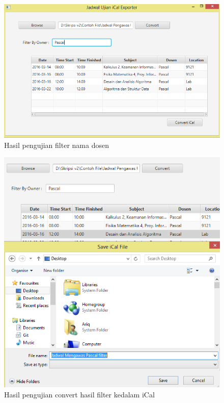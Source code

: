 		\begin{figure}[H]
		\centering
		\includegraphics[scale=0.7]{Gambar/filterDosen}
		\caption{Hasil pengujian filter nama dosen}
		\label{fig:filterDosen}
		\end{figure}

		\begin{figure}[H]
		\centering
		\includegraphics[scale=0.6]{Gambar/filterKonvertiCal}
		\caption{Hasil pengujian convert hasil filter kedalam iCal}
		\label{fig:filterKonvertiCal}
		\end{figure}
		
